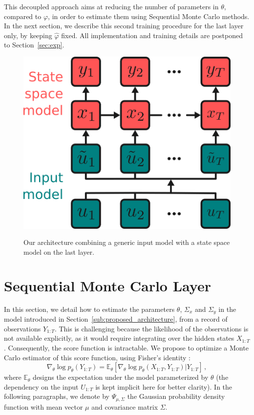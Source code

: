 \documentclass[conference]{IEEEtran}
\begin{document}
This decoupled approach aims at reducing the number of parameters in $\theta$, compared to $\varphi$, in order to estimate them using Sequential Monte Carlo methods.
In the next section, we describe this second training procedure for the last layer only, by keeping $\hat \varphi$ fixed.
All implementation and training details are postponed to Section~\ref{sec:exp}.

\begin{figure}[htpb]
	\centering
	\caption{Our architecture combining a generic input model with a state space model on the last layer.}
	\includegraphics[width=0.5\linewidth]{architecture.png}
	\label{fig:architecture}
\end{figure}

\section{Sequential Monte Carlo Layer}%
\label{sub:uncertainty_estimation}
In this section, we detail how to estimate the parameters $\theta$, $\Sigma_x$ and $\Sigma_y$ in the model introduced in Section~\ref{sub:proposed_architecture}, from a record of observations $Y_{1:T}$.
This is challenging because the likelihood of the observations is not available explicitly, as it would require integrating over the hidden states $X_{1:T}$.
Consequently, the score function is intractable.
We propose to optimize a Monte Carlo estimator of this score function, using Fisher's identity \cite{monographie-randal}:
\begin{equation}
	\nabla_\theta \log p_\theta(Y_{1:T}) = \mathbb{E}_\theta \left[ \nabla_\theta\log p_\theta(X_{1:T}, Y_{1:T}) | Y_{1:T} \right]\,,
	\label{eq:grad_ll}
\end{equation}
where $\mathbb{E}_\theta$ designs the expectation under the model parameterized by $\theta$ (the dependency on the input $U_{1:T}$ is kept implicit here for better clarity).
In the following paragraphs, we denote by $\Psi_{\mu, \Sigma}$ the Gaussian probability density function with mean vector $\mu$ and covariance matrix $\Sigma$.
\end{document}
